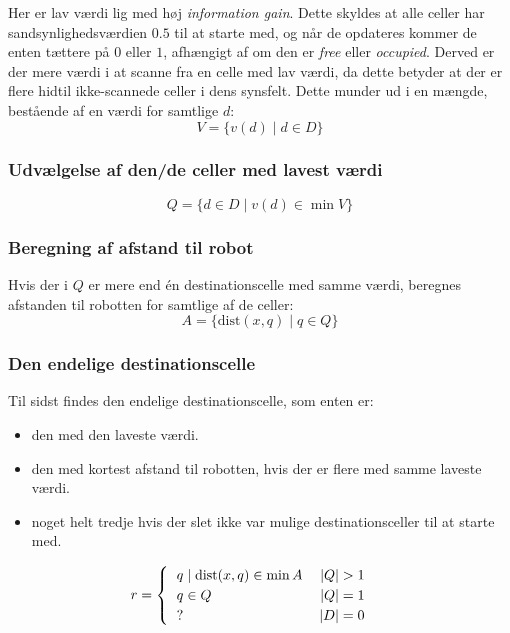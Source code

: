 Her er lav værdi lig med høj \textit{information gain}.
Dette skyldes at alle celler har sandsynlighedsværdien $0.5$ til at starte med, og når de opdateres kommer de enten tættere på $0$ eller $1$, afhængigt af om den er \textit{free} eller \textit{occupied}.
Derved er der mere værdi i at scanne fra en celle med lav værdi, da dette betyder at der er flere hidtil ikke-scannede celler i dens synsfelt.
Dette munder ud i en mængde, bestående af en værdi for samtlige $d$:
\begin{equation}
V = \{ v(d) \mid d \in D \}
\end{equation}

\subsubsection{Udvælgelse af den/de celler med lavest værdi}
\begin{equation}
Q = \{ d \in D \mid v(d) \in \min V \}
\end{equation}

\subsubsection{Beregning af afstand til robot}
Hvis der i $Q$ er mere end én destinationscelle med samme værdi, beregnes afstanden til robotten for samtlige af de celler:
\begin{equation}
A = \{ \text{dist}(x,q) \mid q \in Q \}
\end{equation}

\subsubsection{Den endelige destinationscelle}
Til sidst findes den endelige destinationscelle, som enten er:
\begin{itemize}
\item{den med den laveste værdi.}
\item{den med kortest afstand til robotten, hvis der er flere med samme laveste værdi.}
\item{noget helt tredje hvis der slet ikke var mulige destinationsceller til at starte med.}
\end{itemize}
\begin{equation}
r = \begin{cases}
\begin{tabular}{lr}
$q \mid \text{dist}(x,q) \in \min A$ & $|Q| > 1$\\
$q \in Q$ & $|Q| = 1$ \\
$?$ & $|D| = 0$
\end{tabular}
\end{cases}
\end{equation}

